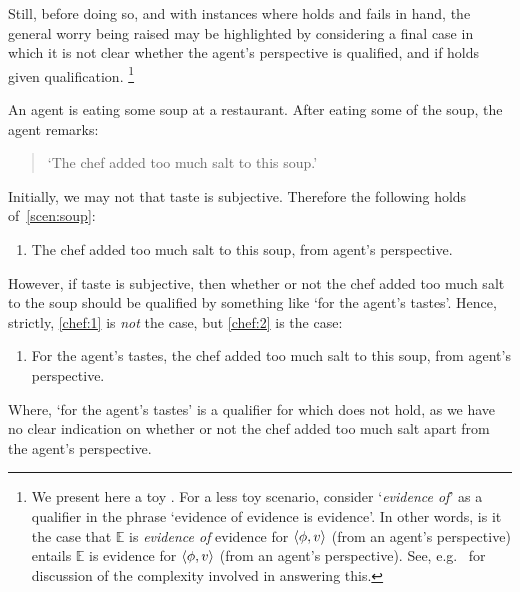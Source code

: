 \begin{note}
  Still, before doing so, and with instances where \ptivity{} holds and fails in hand, the general worry being raised may be highlighted by considering a final case in which it is not clear whether the agent's perspective is qualified, and if \ptivity{} holds given qualification.%
  \footnote{
    We present here a toy .
    For a less toy scenario, consider `\emph{evidence of}' as a qualifier in the phrase `evidence of evidence is evidence'.
    In other words, is it the case that \(\mathbb{E}\) is \emph{evidence of} evidence for \(\langle \phi, v \rangle\) (from an agent's perspective) entails \(\mathbb{E}\) is evidence for \(\langle \phi, v \rangle\) (from an agent's perspective).
    See, e.g.\ \textcite{Tal:2017uw} for discussion of the complexity involved in answering this.
  }

  \begin{scenario}[Soup]
    \label{scen:soup}
    An agent is eating some soup at a restaurant.
    After eating some of the soup, the agent remarks:
    \begin{quote}
      `The chef added too much salt to this soup.'
    \end{quote}
  \end{scenario}

  Initially, we may not that taste is subjective.
  Therefore the following holds of~\autoref{scen:soup}:
  \begin{enumerate}[label=\arabic*, ref=(\arabic*)]
  \item
    \label{chef:1}
    The chef added too much salt to this soup, from agent's perspective.
  \end{enumerate}

  However, if taste is subjective, then whether or not the chef added too much salt to the soup should be qualified by something like `for the agent's tastes'.
  Hence, strictly, \ref{chef:1} is \emph{not} the case, but \ref{chef:2} is the case:

  \begin{enumerate}[label=\arabic*, ref=(\arabic*), resume]
  \item
    \label{chef:2}
    For the agent's tastes, the chef added too much salt to this soup, from agent's perspective.
  \end{enumerate}

  Where, `for the agent's tastes' is a qualifier for which \ptivity{} does not hold, as we have no clear indication on whether or not the chef added too much salt apart from the agent's perspective.


\end{note}
